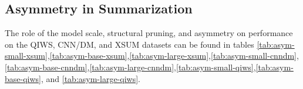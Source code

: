 \begin{table*}[!htb]
    \centering
    \small
    \caption{Impact of Scale on summarization performance on XSUM dataset}
    \label{tab:scale-xsum}
\end{table*}
\subsection{Asymmetry in Summarization}
\label{appendix:asym-full}
The role of the model scale, structural pruning, and asymmetry on performance on the QIWS, CNN/DM, and XSUM datasets can be found in tables \ref{tab:asym-small-xsum},\ref{tab:asym-base-xsum},\ref{tab:asym-large-xsum},\ref{tab:asym-small-cnndm},\ref{tab:asym-base-cnndm},\ref{tab:asym-large-cnndm},\ref{tab:asym-small-qiws},\ref{tab:asym-base-qiws}, and \ref{tab:asym-large-qiws}.

